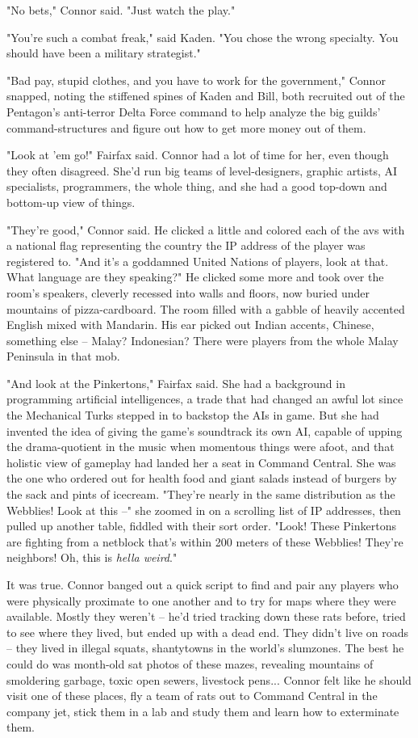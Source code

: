 "No bets," Connor said. "Just watch the play."

"You're such a combat freak," said Kaden. "You chose the wrong
specialty. You should have been a military strategist."

"Bad pay, stupid clothes, and you have to work for the government,"
Connor snapped, noting the stiffened spines of Kaden and Bill, both
recruited out of the Pentagon's anti-terror Delta Force command to
help analyze the big guilds' command-structures and figure out how
to get more money out of them.

"Look at 'em go!" Fairfax said. Connor had a lot of time for her,
even though they often disagreed. She'd run big teams of
level-designers, graphic artists, AI specialists, programmers, the
whole thing, and she had a good top-down and bottom-up view of
things.

"They're good," Connor said. He clicked a little and colored each
of the avs with a national flag representing the country the IP
address of the player was registered to. "And it's a goddamned
United Nations of players, look at that. What language are they
speaking?" He clicked some more and took over the room's speakers,
cleverly recessed into walls and floors, now buried under mountains
of pizza-cardboard. The room filled with a gabble of heavily
accented English mixed with Mandarin. His ear picked out Indian
accents, Chinese, something else -- Malay? Indonesian? There were
players from the whole Malay Peninsula in that mob.

"And look at the Pinkertons," Fairfax said. She had a background in
programming artificial intelligences, a trade that had changed an
awful lot since the Mechanical Turks stepped in to backstop the AIs
in game. But she had invented the idea of giving the game's
soundtrack its own AI, capable of upping the drama-quotient in the
music when momentous things were afoot, and that holistic view of
gameplay had landed her a seat in Command Central. She was the one
who ordered out for health food and giant salads instead of burgers
by the sack and pints of icecream. "They're nearly in the same
distribution as the Webblies! Look at this --" she zoomed in on a
scrolling list of IP addresses, then pulled up another table,
fiddled with their sort order. "Look! These Pinkertons are fighting
from a netblock that's within 200 meters of these Webblies! They're
neighbors! Oh, this is \emph{hella weird}."

It was true. Connor banged out a quick script to find and pair any
players who were physically proximate to one another and to try for
maps where they were available. Mostly they weren't -- he'd tried
tracking down these rats before, tried to see where they lived, but
ended up with a dead end. They didn't live on roads -- they lived
in illegal squats, shantytowns in the world's slumzones. The best
he could do was month-old sat photos of these mazes, revealing
mountains of smoldering garbage, toxic open sewers, livestock
pens... Connor felt like he should visit one of these places, fly a
team of rats out to Command Central in the company jet, stick them
in a lab and study them and learn how to exterminate them.

